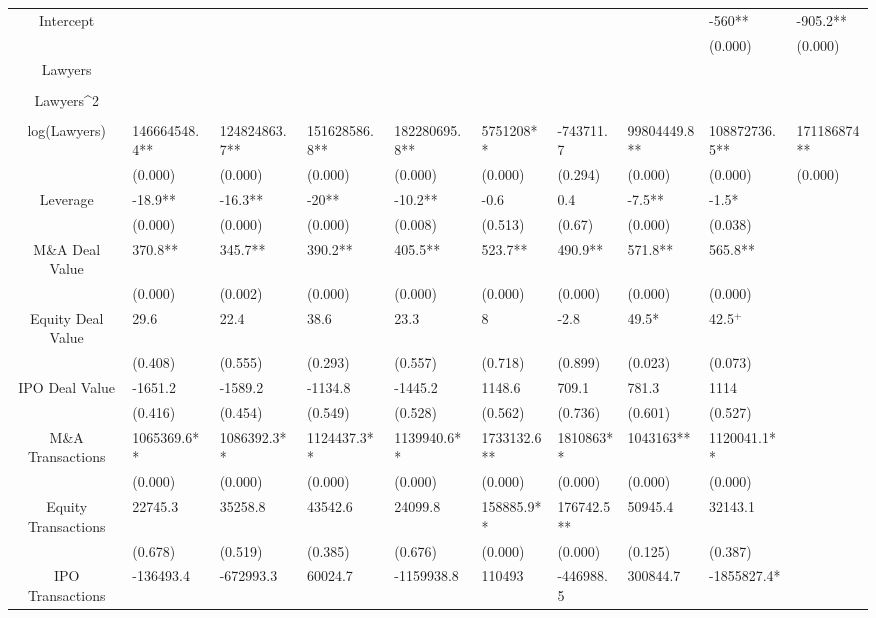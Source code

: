 \documentclass{article}
\begin{document}
\begin{table}[H]
\begin{tabular}{|clllllllll|}
Intercept &  &  &  &  &  &  &  & -560** & -905.2** \\ 
   &  &  &  &  &  &  &  & (0.000) & (0.000) \\ 
  Lawyers &  &  &  &  &  &  &  &  &  \\ 
   &  &  &  &  &  &  &  &  &  \\ 
  Lawyers^2 &  &  &  &  &  &  &  &  &  \\ 
   &  &  &  &  &  &  &  &  &  \\ 
  log(Lawyers) & 146664548.4** & 124824863.7** & 151628586.8** & 182280695.8** & 5751208** & -743711.7 & 99804449.8** & 108872736.5** & 171186874** \\ 
   & (0.000) & (0.000) & (0.000) & (0.000) & (0.000) & (0.294) & (0.000) & (0.000) & (0.000) \\ 
  Leverage & -18.9** & -16.3** & -20** & -10.2** & -0.6 & 0.4 & -7.5** & -1.5* &  \\ 
   & (0.000) & (0.000) & (0.000) & (0.008) & (0.513) & (0.67) & (0.000) & (0.038) &  \\ 
  M\&A Deal Value & 370.8** & 345.7** & 390.2** & 405.5** & 523.7** & 490.9** & 571.8** & 565.8** &  \\ 
   & (0.000) & (0.002) & (0.000) & (0.000) & (0.000) & (0.000) & (0.000) & (0.000) &  \\ 
  Equity Deal Value & 29.6 & 22.4 & 38.6 & 23.3 & 8 & -2.8 & 49.5* & 42.5$^{+}$ &  \\ 
   & (0.408) & (0.555) & (0.293) & (0.557) & (0.718) & (0.899) & (0.023) & (0.073) &  \\ 
  IPO Deal Value & -1651.2 & -1589.2 & -1134.8 & -1445.2 & 1148.6 & 709.1 & 781.3 & 1114 &  \\ 
   & (0.416) & (0.454) & (0.549) & (0.528) & (0.562) & (0.736) & (0.601) & (0.527) &  \\ 
  M\&A Transactions & 1065369.6** & 1086392.3** & 1124437.3** & 1139940.6** & 1733132.6** & 1810863** & 1043163** & 1120041.1** &  \\ 
   & (0.000) & (0.000) & (0.000) & (0.000) & (0.000) & (0.000) & (0.000) & (0.000) &  \\ 
  Equity Transactions & 22745.3 & 35258.8 & 43542.6 & 24099.8 & 158885.9** & 176742.5** & 50945.4 & 32143.1 &  \\ 
   & (0.678) & (0.519) & (0.385) & (0.676) & (0.000) & (0.000) & (0.125) & (0.387) &  \\ 
  IPO Transactions & -136493.4 & -672993.3 & 60024.7 & -1159938.8 & 110493 & -446988.5 & 300844.7 & -1855827.4* &  \\ 

\end{tabular}
\end{table}
\end{document}
